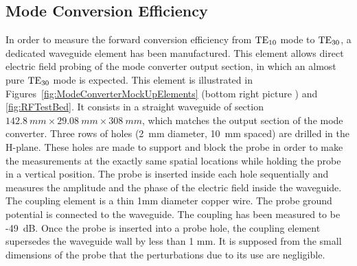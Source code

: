\clearpage
\subsection{Mode Conversion Efficiency}
In order to measure the forward conversion efficiency from ${\mathrm{TE}}_{10}$ mode to ${\mathrm{TE}}_{30}$, a dedicated waveguide element has been manufactured. This element allows direct electric field probing of the mode converter output section, in which an almost pure ${\mathrm{TE}}_{30}$ mode is expected. This element is illustrated in Figures~\ref{fig:ModeConverterMockUpElements} (bottom right picture ) and \ref{fig:RFTestBed}. It consists in a straight waveguide of section $142.8~\si{mm}\times29.08~\si{mm}\times308~\si{mm}$, which matches the output section of the mode converter. Three rows of holes (2~mm diameter, 10~mm spaced) are drilled in the H-plane. These holes are made to support and block the probe in order to make the measurements at the exactly same spatial locations while holding the probe in a vertical position. The probe is inserted inside each hole sequentially and measures the amplitude and the phase of the electric field inside the waveguide. The coupling element is a thin 1mm diameter copper wire.  The probe ground potential is connected to the waveguide. The coupling has been measured to be -49~dB. Once the probe is inserted into a probe hole, the coupling element supersedes the waveguide wall by less than 1 mm. It is supposed from the small dimensions of the probe that the perturbations due to its use are negligible.  

